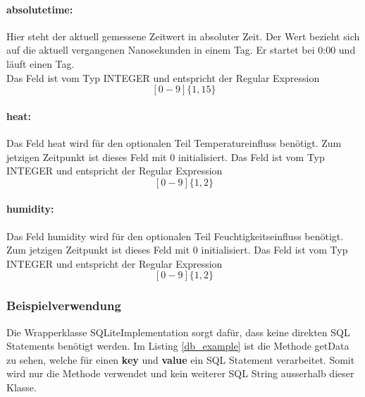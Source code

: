     \paragraph{absolutetime:}
    Hier steht der aktuell gemessene Zeitwert in absoluter Zeit. Der Wert bezieht sich auf die aktuell vergangenen Nanosekunden in einem Tag. Er startet bei 0:00 und läuft einen Tag.\\
    Das Feld ist vom Typ INTEGER und entspricht der Regular Expression
    $$[0-9]\{1,15\}$$
    \paragraph{heat:}
    Das Feld heat wird für den optionalen Teil Temperatureinfluss benötigt. Zum jetzigen Zeitpunkt ist dieses Feld mit 0 initialisiert.
    Das Feld ist vom Typ INTEGER und entspricht der Regular Expression
    $$[0-9]\{1,2\}$$
    \paragraph{humidity:}
    Das Feld humidity wird für den optionalen Teil Feuchtigkeitseinfluss benötigt. Zum jetzigen Zeitpunkt ist dieses Feld mit 0 initialisiert.
    Das Feld ist vom Typ INTEGER und entspricht der Regular Expression
    $$[0-9]\{1,2\}$$
    
    \subsubsection{Beispielverwendung}
    Die Wrapperklasse SQLiteImplementation sorgt dafür, dass keine direkten SQL Statements benötigt werden. Im Listing \ref{db_example} ist die Methode getData zu sehen, welche für einen \textbf{key} und \textbf{value} ein SQL Statement verarbeitet. Somit wird nur die Methode verwendet und kein weiterer SQL String ausserhalb dieser Klasse.
    
    